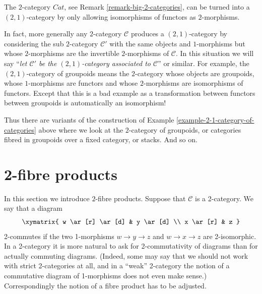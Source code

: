 \begin{example}
\label{example-2-1-category-of-categories}
The $2$-category $\textit{Cat}$, see Remark \ref{remark-big-2-categories},
can be turned into a $(2, 1)$-category by only allowing isomorphisms of
functors as $2$-morphisms.
\end{example}

\noindent
In fact, more generally any $2$-category
$\mathcal{C}$ produces a $(2, 1)$-category by considering the sub $2$-category
$\mathcal{C}'$ with the same objects and $1$-morphisms but whose
$2$-morphisms are the invertible $2$-morphisms of $\mathcal{C}$.
In this situation we will say ``{\it let $\mathcal{C}'$ be
the $(2, 1)$-category associated to $\mathcal{C}$}'' or similar.
For example, the $(2, 1)$-category of groupoids means the
$2$-category whose objects are groupoids, whose
$1$-morphisms are functors and whose $2$-morphisms are
isomorphisms of functors. Except that this is a bad example as a
transformation between functors between groupoids is automatically
an isomorphism!

\begin{remark}
\label{remark-other-2-categories}
Thus there are variants of the construction of
Example \ref{example-2-1-category-of-categories}
above where we look at the $2$-category of groupoids,
or categories fibred in groupoids over a fixed
category, or stacks. And so on.
\end{remark}






\section{2-fibre products}
\label{section-2-fibre-products}

\noindent
In this section we introduce $2$-fibre products. Suppose that $\mathcal{C}$
is a 2-category. We say that a diagram
$$
\xymatrix{
w \ar[r] \ar[d] & y \ar[d] \\
x \ar[r] & z }
$$
2-commutes if the two 1-morphisms $w \to y \to z$ and $w \to x \to z$ are
2-isomorphic. In a 2-category it is more natural to ask for 2-commutativity
of diagrams than for actually commuting diagrams. (Indeed, some may say that
we should not work with strict 2-categories at all, and in a ``weak''
2-category the notion of a commutative diagram of 1-morphisms does not even
make sense.) Correspondingly the notion of a fibre product has to be adjusted.

